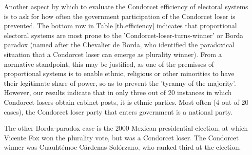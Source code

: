 \documentclass[12pt]{scrartcl}
\begin{document}

Another aspect by which to evaluate the Condorcet efficiency of electoral systems is to ask for how often the government participation of the Condorcet loser is prevented. The bottom row in Table \ref{tb.efficiency} indicates that proportional electoral systems are most prone to the 'Condorcet-loser-turns-winner' \citep{vanDeemen1993} or Borda paradox (named after the Chevalier de Borda, who identified the paradoxical situation that a Condorcet loser can emerge as plurality winner). From a normative standpoint, this may be justified, as one of the premisses of proportional systems is to enable ethnic, religious or other minorities to have their legitimate share of power, so as to prevent the 'tyranny of the majority'. However, our results indicate that in only three out of 20 instances in which Condorcet losers obtain cabinet posts, it is ethnic parties. Most often (4 out of 20 cases), the Condorcet loser party that enters government is a national party. %


The other Borda-paradox case is the 2000 Mexican presidential election, at which Vicente Fox won the plurality vote, but was a Condorcet loser. The Condorcet winner was Cuauht\'{e}moc C\'{a}rdenas Sol\'{o}rzano, who ranked third at the election.
\end{document}
